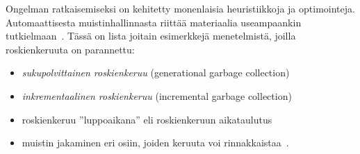 Ongelman ratkaisemiseksi on kehitetty monenlaisia heuristiikkoja ja optimointeja. Automaattisesta muistinhallinnasta riittää materiaalia useampaankin tutkielmaan~\cite{gcbib}. Tässä on lista joitain esimerkkejä menetelmistä, joilla roskienkeruuta on parannettu:


\begin{itemize}
\item \textit{sukupolvittainen roskienkeruu} (generational garbage collection)~\cite{v8design}
\item \textit{inkrementaalinen roskienkeruu} (incremental garbage collection)~\cite{incrementalgc}
\item roskienkeruu ''luppoaikana'' eli roskienkeruun aikataulutus~\cite{freegc}
\item muistin jakaminen eri osiin, joiden keruuta voi rinnakkaistaa~\cite{ie10}.
\end{itemize}